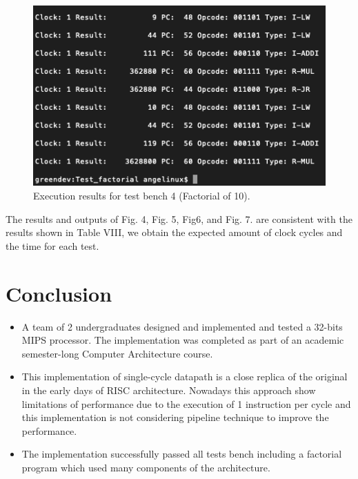 \documentclass[conference]{IEEEtran}
\begin{document}
\begin{figure}[h]
\includegraphics[scale=0.5]{test_bench_4_factorial.png}
\caption{Execution results for test bench 4 (Factorial of 10).}
\label{result3}
\end{figure}

The results and outputs of Fig. 4, Fig. 5, Fig6, and Fig. 7. are consistent with the results shown in Table VIII, we obtain the expected amount of clock cycles and the time for each test.
 
\section{Conclusion}
\begin{itemize}
\item A team of 2 undergraduates designed and implemented and tested a 32-bits MIPS processor. The implementation was completed as part of an academic semester-long Computer Architecture course.
\item This implementation of single-cycle datapath is a close replica of the original in the early days of RISC architecture. Nowadays this approach show limitations of performance due to the execution of 1 instruction per cycle and this implementation is not considering pipeline technique to improve the performance.
\item The implementation successfully passed all tests bench including a factorial program which used many components of the architecture.
\end{itemize}
\end{document}
